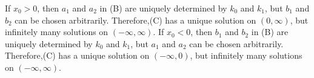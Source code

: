 \documentclass{ximera}
\begin{document}
\begin{problem}
\begin{enumerate}
\begin{solution}
    If $x_0>0$, then $a_1$ and $a_2$ in (B) are uniquely
determined by $k_0$ and $k_1$, but $b_1$ and $b_2$ can be chosen
arbitrarily. Therefore,(C) has a unique solution on
$(0,\infty)$, but infinitely many solutions on $(-\infty,\infty)$.
  If $x_0<0$, then $b_1$ and $b_2$ in (B) are uniquely
determined by $k_0$ and $k_1$, but $a_1$ and $a_2$ can be chosen
arbitrarily. Therefore,(C) has a unique solution on
$(-\infty,0)$, but infinitely many solutions on $(-\infty,\infty)$.

\end{solution}
\end{enumerate}
\end{problem}
\end{document}

